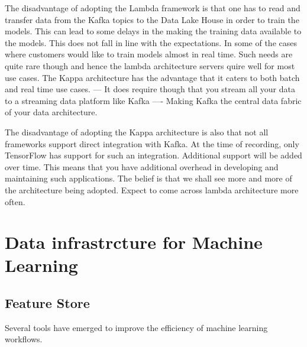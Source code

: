 \documentclass[a4paper, 11pt]{article}
\begin{document}
    The disadvantage of adopting the Lambda framework is that one has to read and transfer data from the Kafka topics to the Data Lake House in order to train the models.
    This can lead to some delays in the making the training data available to the models.
    This does not fall in line with the expectations.
    In some of the cases where customers would like to train models almost in real time.
    Such needs are quite rare though and hence the lambda architecture servers quire well for most use cases.
    The Kappa architecture has the advantage that it caters to both batch and real time use cases.
    --- It does require though that you stream all your data to a streaming data platform like Kafka
    ---- Making Kafka the central data fabric of your data architecture.

    The disadvantage of adopting the Kappa architecture is also that not all frameworks support direct integration with Kafka.
    At the time of recording, only TensorFlow has support for such an integration.
    Additional support will be added over time.
    This means that you have additional overhead in developing and maintaining such applications.
    The belief is that we shall see more and more of the architecture being adopted.
    Expect to come across lambda architecture more often.
    

    \section{Data infrastrcture for Machine Learning}

    \subsection{Feature Store}
    Several tools have emerged to improve the efficiency of machine learning workflows.
\end{document}
